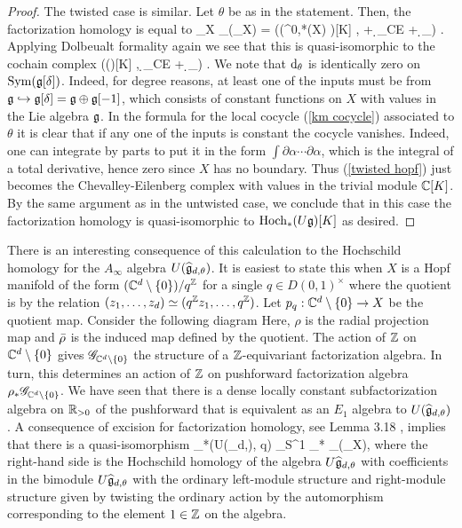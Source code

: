 \documentclass[10pt]{amsart}
\begin{document}
\begin{proof}
The twisted case is similar. 
Let $\theta$ be as in the statement.
Then, the factorization homology is equal to
\ben
\int_X \UU_\theta (\sG_X) = \left(\Sym(\Omega^{0,*}(X) \tensor \fg)[K] , \dbar + \d_{CE} + \d_\theta\right) .
\een
Applying Dolbeualt formality again we see that this is quasi-isomorphic to the cochain complex
\be\label{twisted hopf}
\left(\Sym(\fg[\delta])[K] ,  \d_{CE} + \d_\theta \right) .
\ee
We note that ${\rm d}_\theta$ is identically zero on ${\rm Sym}(\mathfrak g[\delta])$. 
Indeed, for degree reasons, at least one of the inputs must be from $\mathfrak g \hookrightarrow \mathfrak g[\delta] = \mathfrak g \oplus \mathfrak g[-1]$, which consists of constant functions on $X$ with values in the Lie algebra $\mathfrak g$. 
In the formula for the local cocycle (\ref{km cocycle}) associated to $\theta$ it is clear that if any one of the inputs is constant the cocycle vanishes. 
Indeed, one can integrate by parts to put it in the form $\int \partial \alpha \cdots \partial \alpha$, which is the integral of a total derivative, hence zero since $X$ has no boundary.
Thus (\ref{twisted hopf}) just becomes the Chevalley-Eilenberg complex with values in the trivial module $\mathbb C[K]$. 
By the same argument as in the untwisted case, we conclude that in this case the factorization homology is quasi-isomorphic to ${\rm Hoch}_*(U \mathfrak g)[K]$ as desired.
\end{proof}

There is an interesting consequence of this calculation to the Hochschild homology for the $A_\infty$ algebra $U(\widehat{\mathfrak g}_{d,\theta})$.
It is easiest to state this when $X$ is a Hopf manifold of the form $(\mathbb C^d \setminus \{0\}) / q^\mathbb Z$ for a single $q \in D(0,1)^\times$ where the quotient is by the relation $(z_1,\ldots,z_d) \simeq (q^\mathbb Z z_1,\ldots,q^\mathbb Z)$.
Let $p_q :  \mathbb C^d \setminus \{0\} \to X$ be the quotient map.
Consider the following diagram
\ben
{}
\een
Here, $\rho$ is the radial projection map and $\Bar{\rho}$ is the induced map defined by the quotient.
The action of $\mathbb Z$ on $\mathbb C^d \setminus\{0\}$ gives $\mathscr G_{\mathbb C^d \setminus \{0\}}$ the structure of a $\mathbb Z$-equivariant factorization algebra. 
In turn, this determines an action of $\mathbb Z$ on pushforward factorization algebra $\rho_* \mathscr G_{\mathbb C^d \setminus \{0\}}$.
We have seen that there is a dense locally constant subfactorization algebra on $\mathbb R_{>0}$ of the pushforward that is equivalent as an $E_1$ algebra to $U(\widehat{\mathfrak g}_{d,\theta})$.
A consequence of excision for factorization homology, see Lemma 3.18 \cite{AFT1}, implies that there is a quasi-isomorphism
\ben
\Hoch_*(U(\Hat{\fg}_{d,\theta}), q) \simeq \int_{S^1} \Bar{\rho}_* \UU_\alpha(\sG_X),
\een
where the right-hand side is the Hochschild homology of the algebra $U \widehat{\mathfrak g}_{d,\theta}$ with coefficients in the bimodule $U \widehat{\mathfrak g}_{d, \theta}$ with the ordinary left-module structure and right-module structure given by twisting the ordinary action by the automorphism corresponding to the element $1 \in \mathbb Z$ on the algebra.
\end{document}
